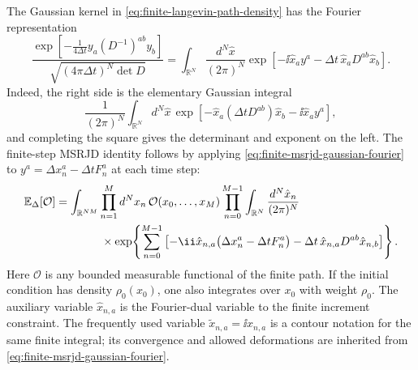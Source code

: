 The Gaussian kernel in \eqref{eq:finite-langevin-path-density} has the
Fourier representation
\begin{equation}
  \frac{
    \exp\!\left[-\frac{1}{4\Delta t}y_a(D^{-1})^{ab}y_b\right]}
    {\sqrt{(4\pi\Delta t)^N\det D}}
  =
  \int_{\mathbb R^N}\frac{d^N\hat x}{(2\pi)^N}
  \exp\!\left[
    -\ii\hat x_a y^a
    -\Delta t\,\hat x_aD^{ab}\hat x_b
  \right].
  \label{eq:finite-msrjd-gaussian-fourier}
\end{equation}
Indeed, the right side is the elementary Gaussian integral
\[
  \frac{1}{(2\pi)^N}
  \int_{\mathbb R^N}d^N\hat x\,
  \exp\!\left[-\hat x_a(\Delta t D^{ab})\hat x_b-\ii\hat x_a y^a\right],
\]
and completing the square gives the determinant and exponent on the left.
The finite-step MSRJD identity follows by applying
\eqref{eq:finite-msrjd-gaussian-fourier} to
\(y^a=\Delta x_n^a-\Delta t F_n^a\) at each time step:
\begin{align}
  \mathbb E_\Delta[\mathcal O]
  &=
  \int_{\mathbb R^{NM}}\prod_{n=1}^{M}d^Nx_n\,
  \mathcal O(x_0,\ldots,x_M)
  \prod_{n=0}^{M-1}
  \int_{\mathbb R^N}\frac{d^N\hat x_n}{(2\pi)^N}
  \notag\\
  &\qquad\qquad\times
  \exp\!\left\{
    \sum_{n=0}^{M-1}
    \left[
      -\ii\hat x_{n,a}
      \bigl(\Delta x_n^a-\Delta t F_n^a\bigr)
      -\Delta t\,\hat x_{n,a}D^{ab}\hat x_{n,b}
    \right]
  \right\}.
  \label{eq:finite-msrjd-identity}
\end{align}
Here \(\mathcal O\) is any bounded measurable functional of the finite path.
If the initial condition has density \(\rho_0(x_0)\), one also integrates
over \(x_0\) with weight \(\rho_0\).  The auxiliary variable
\(\hat x_{n,a}\) is the Fourier-dual variable to the finite increment
constraint.  The frequently used variable \(\widetilde x_{n,a}=\ii\hat x_{n,a}\)
is a contour notation for the same finite integral; its convergence and
allowed deformations are inherited from \eqref{eq:finite-msrjd-gaussian-fourier}.

